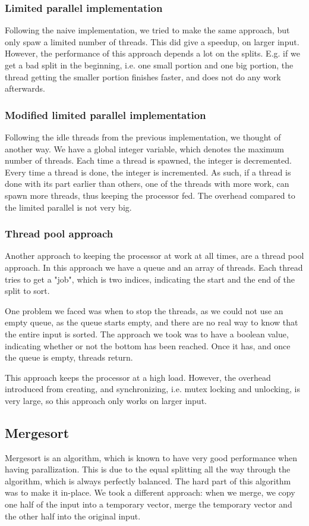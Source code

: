 \subsubsection{Limited parallel implementation}
Following the naive implementation, we tried to make the same approach, but
only spaw a limited number of threads. This did give a speedup, on larger
input. However, the performance of this approach depends a lot on the splits.
E.g. if we get a bad split in the beginning, i.e. one small portion and one big
portion, the thread getting the smaller portion finishes faster, and does not
do any work afterwards.

\subsubsection{Modified limited parallel implementation}
Following the idle threads from the previous implementation, we thought of
another way. We have a global integer variable, which denotes the maximum
number of threads. Each time a thread is spawned, the integer is decremented.
Every time a thread is done, the integer is incremented. As such, if a thread
is done with its part earlier than others, one of the threads with more work,
can spawn more threads, thus keeping the processor fed. The overhead compared
to the limited parallel is not very big.

\subsubsection{Thread pool approach}
Another approach to keeping the processor at work at all times, are a thread
pool approach. In this approach we have a queue and an array of threads. Each
thread tries to get a "job", which is two indices, indicating the start and the
end of the split to sort.

One problem we faced was when to stop the threads, as we could not use an empty
queue, as the queue starts empty, and there are no real way to know that the
entire input is sorted. The approach we took was to have a boolean value,
indicating whether or not the bottom has been reached. Once it has, and once
the queue is empty, threads return.

This approach keeps the processor at a high load. However, the overhead
introduced from creating, and synchronizing, i.e. mutex locking and unlocking,
is very large, so this approach only works on larger input.

\subsection{Mergesort}
Mergesort is an algorithm, which is known to have very good performance when
having parallization. This is due to the equal splitting all the way through
the algorithm, which is always perfectly balanced. The hard part of this
algorithm was to make it in-place. We took a different approach: when we merge,
we copy one half of the input into a temporary vector, merge the temporary
vector and the other half into the original input.

